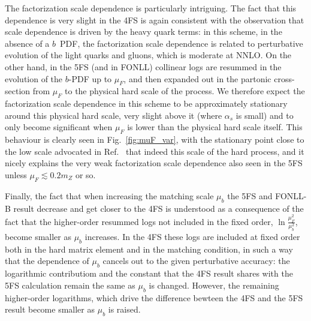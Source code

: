 \documentclass[12pt]{article}
\begin{document}
The factorization scale dependence is particularly intriguing. The
fact that this dependence is very slight in the 4FS is again consistent
with the observation that scale dependence is driven by the heavy
quark terms: in this scheme, in the absence of a $b$~PDF, the factorization scale
dependence is  related to perturbative evolution of the light
quarks and gluons, which is moderate at NNLO. 
On the other hand, in the 5FS (and in FONLL) collinear logs are
resummed in the evolution  of the $b$-PDF up to $\mu_F$, and then
expanded out in the partonic cross-section from $\mu_F$ to the
physical hard scale of the process. We therefore expect the
factorization scale dependence in this scheme to be approximately
stationary around this physical hard scale, very slight above it (where
$\alpha_s$ is small) and to only become significant when $\mu_F$ is
lower than the physical hard scale itself. This behaviour is
clearly seen in Fig.~\ref{fig:muF_var}, with the stationary point
close to the low scale advocated in Ref.~\cite{Maltoni:2012pa,Lim:2016wjo} 
that indeed this scale of the hard process, and it nicely explains the
very weak factorization scale dependence also seen in the 5FS unless
$\mu_F\lesssim0.2m_Z$ or so.

Finally, the fact that when increasing the matching scale $\mu_b$ the
5FS and FONLL-B result decrease and get closer to the 4FS is
understood as a consequence of the fact that the higher-order resummed
logs not included in the fixed order, $\ln\frac{\mu_F^2}{\mu_b^2}$,
become smaller as $\mu_b$ increases. In the 4FS these logs are
included at fixed order both in the hard matrix element and in the
matching condition, in such a way that the dependence of $\mu_b$
cancels out to the given perturbative accuracy: the logarithmic
contributiom and the constant that the 4FS result shares with the 5FS
calculation  
remain the same as
$\mu_b$ is changed. However,  the remaining
higher-order logarithms, which drive the difference bewteen the 4FS and
the 5FS result  become smaller as $\mu_b$ is raised.


\end{document}
